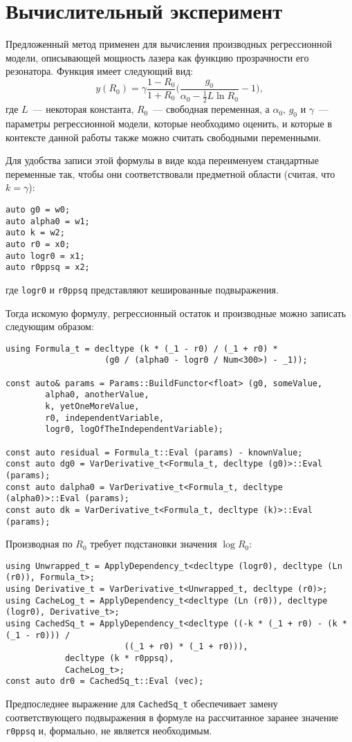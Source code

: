 \documentclass[11pt,a4paper]{article}
\begin{document}
\section{Вычислительный эксперимент}

Предложенный метод применен для вычисления производных регрессионной модели,
описывающей мощность лазера как функцию прозрачности его
резонатора\cite{Rudoy16StabilityAnalysis}.
Функция имеет следующий вид:
\[
  y(R_0) = \gamma \frac{1 - R_0}{1 + R_0} \Big(\frac{g_0}{\alpha_0 - \frac{1}{2} L \ln R_0} - 1\Big),
\]
где $L$~--- некоторая константа, $R_0$~--- свободная переменная, а $\alpha_0$, $g_0$ и
$\gamma$~--- параметры регрессионной модели, которые необходимо оценить, и которые
в контексте данной работы также можно считать свободными переменными.

Для удобства записи этой формулы в виде кода переименуем стандартные переменные так,
чтобы они соответствовали предметной области (считая, что $k = \gamma$):
\begin{lstlisting}
auto g0 = w0;
auto alpha0 = w1;
auto k = w2;
auto r0 = x0;
auto logr0 = x1;
auto r0ppsq = x2;
\end{lstlisting}
где \texttt{logr0} и \texttt{r0ppsq} представляют кешированные подвыражения.

Тогда искомую формулу, регрессионный остаток и производные можно записать следующим образом:
\begin{lstlisting}
using Formula_t = decltype (k * (_1 - r0) / (_1 + r0) *
					(g0 / (alpha0 - logr0 / Num<300>) - _1));

const auto& params = Params::BuildFunctor<float> (g0, someValue,
        alpha0, anotherValue,
        k, yetOneMoreValue,
        r0, independentVariable,
        logr0, logOfTheIndependentVariable);

const auto residual = Formula_t::Eval (params) - knownValue;
const auto dg0 = VarDerivative_t<Formula_t, decltype (g0)>::Eval (params);
const auto dalpha0 = VarDerivative_t<Formula_t, decltype (alpha0)>::Eval (params);
const auto dk = VarDerivative_t<Formula_t, decltype (k)>::Eval (params);
\end{lstlisting}

Производная по $R_0$ требует подстановки значения $\log R_0$:
\begin{lstlisting}
using Unwrapped_t = ApplyDependency_t<decltype (logr0), decltype (Ln (r0)), Formula_t>;
using Derivative_t = VarDerivative_t<Unwrapped_t, decltype (r0)>;
using CacheLog_t = ApplyDependency_t<decltype (Ln (r0)), decltype (logr0), Derivative_t>;
using CachedSq_t = ApplyDependency_t<decltype ((-k * (_1 + r0) - (k * (_1 - r0))) /
						((_1 + r0) * (_1 + r0))),
			decltype (k * r0ppsq),
			CacheLog_t>;
const auto dr0 = CachedSq_t::Eval (vec);
\end{lstlisting}
Предпоследнее выражение для \texttt{CachedSq\_t} обеспечивает замену соответствующего
подвыражения в формуле на рассчитанное заранее значение \texttt{r0ppsq} и, формально,
не является необходимым.
\end{document}
